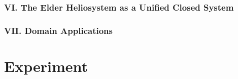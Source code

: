 \documentclass[11pt,twoside]{book}
\begin{document}
\section*{VI. The Elder Heliosystem as a Unified Closed System}

\section*{VII. Domain Applications}

\part{Experiment}




\backmatter
\printbibliography[title={References}]
\end{document}
